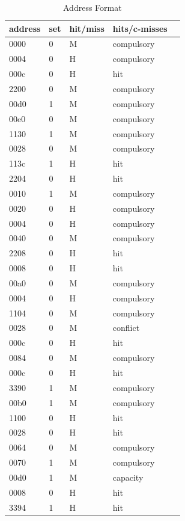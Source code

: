 \documentclass{article}
\begin{document}
\begin{table}[H]
	\centering
	\caption{Address Format}
	\label{my-label}
	\begin{tabular}{|l|lll|l|}
		\hline
		address & set & hit/miss & hits/c-misses\\ \hline
		0000    &0     &      M    & compulsory\\ \hline
		0004    & 0    &      H    & compulsory\\ \hline
		000c    &  0   &      H    &hit \\ \hline
		2200    &   0  &M          & compulsory\\ \hline
		00d0    & 1    &M          & compulsory\\ \hline
		00e0    &  0   &M          & compulsory\\ \hline
		1130    &  1   &M          &compulsory \\ \hline
		0028    &  0   &M          & compulsory\\ \hline
		113c    &  1   &H          & hit \\ \hline
		2204    &0     &H          & hit \\ \hline
		0010    &1     & M         & compulsory\\ \hline
		0020    &  0   &  H        & compulsory\\ \hline
		0004    &    0 &   H       & compulsory\\ \hline
		0040    &  0   &M          &compulsory \\ \hline
		2208    & 0    & H         & hit \\ \hline
		0008    &   0  &  H        &hit  \\ \hline
		00a0    &  0   &  M        & compulsory\\ \hline
		0004    &  0   &   H       &compulsory \\ \hline
		1104    &  0   &    M      &compulsory \\ \hline
		0028    &  0   &     M     & conflict\\ \hline
		000c    & 0    &      H    & hit \\ \hline
		0084    &  0   &       M   & compulsory\\ \hline
		000c    &0     &H          &hit  \\ \hline
		3390    &  1   &M          & compulsory\\ \hline
		00b0    &   1  &M          & compulsory\\ \hline
		1100    & 0    &H          & hit \\ \hline
		0028    &  0   &H          &hit  \\ \hline
		0064    & 0    &M          &compulsory \\ \hline
		0070    &1     &M          & compulsory\\ \hline
		00d0    & 1    &M          &capacity \\ \hline
		0008    &0     &H          & hit \\ \hline
		3394    &  1   &H          & hit \\ \hline
	\end{tabular}
\end{table}
\end{document}

